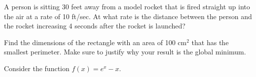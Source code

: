 \documentclass[addpoints,12pt]{exam}
\begin{document}
\begin{questions}

\newpage

\question[8] A person is sitting 30 feet away from a model rocket that is fired straight up into the
air at a rate of 10 ft/sec. At what rate is the distance between the person and the rocket
increasing 4 seconds after the rocket is launched?


\newpage


\question[8] Find the dimensions of the rectangle with an area of 100 cm$^2$ that has the
smallest perimeter. Make sure to justify why your result is the global minimum.

\newpage




\question Consider the function $f(x)=e^x - x$.

\end{questions}
\end{document}
